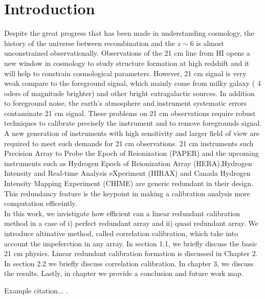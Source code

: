 \chapter{Introduction}

Despite the great progress that has been made in understanding cosmology, the history of the universe between recombination and the $z \sim 6$ is almost unconstrained observationally. Observations of the 21 cm line from HI opens a new window in cosmology to study structure formation at high redshift and it will help to constrain cosmological parameters\citet{a}. However, 21 cm signal is very weak compare  to the foreground signal, which mainly come from milky galaxy ( 4 oders of magnitude brighter) \citet{b} and other bright extragalactic sources. In addition to foreground noise, the earth's atmosphere and instrument systematic errors contaminate 21 cm signal. These problems on 21 cm observations require robust techniques to calibrate precisely the instrument and to remove foregrounds signal. \\
 A new generation of instruments with high sensitivity and larger field of view are required to meet such demands for 21 cm observations.  21 cm instruments such Precision Array to Probe the Epoch of Reionization (PAPER) and the upcoming instruments such as Hydrogen Epoch of Reionization Array (HERA)\citet{a},Hydrogen Intensity and Real-time Analysis eXperiment  (HIRAX) and Canada Hydrogen Intensity Mapping Experiment (CHIME) are generic redundant in their design. This redundancy feature is the keypoint in making a calibration analysis more computation efficeintly.
 \\In this work, we invistigate how efficient can a linear redundant calibration method in a case of i) perfect redundant array and ii) quasi redundant array. We introduce altinative method, called correlation calibration, which take into account the impeferction in any array. In section 1.1, we briefly discuss the basic 21 cm physics.  Linear redundant calibration formation is discussed in Chapter 2. In section 2.2 we briefly discuss correlation calibration. In chapter 3, we discuss the results. Lastly, in chapter we provide a conclusion and future work map.

Example citation... \citet{Abell_1958}.


